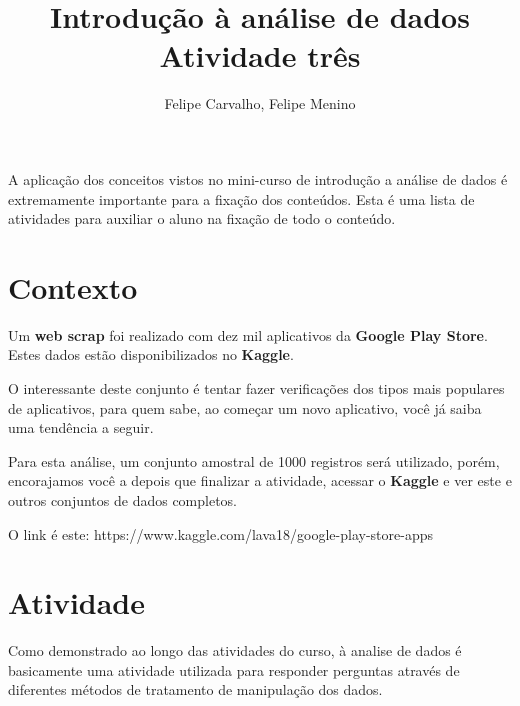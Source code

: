 \documentclass[12pt]{article}
\title{Introdução à análise de dados\\ Atividade três}
\author{Felipe Carvalho\inst{1}, Felipe Menino\inst{1}}
\begin{document}
 

\maketitle

     
\begin{resumo} 
    A aplicação dos conceitos vistos no mini-curso de introdução a análise de dados é extremamente importante para a fixação dos conteúdos. Esta é uma lista de atividades para auxiliar o aluno na fixação de todo o conteúdo.
\end{resumo}

\section{Contexto}

Um \textbf{web scrap} foi realizado com dez mil aplicativos da \textbf{Google Play Store}. Estes dados estão disponibilizados no \textbf{Kaggle}.

O interessante deste conjunto é tentar fazer verificações dos tipos mais populares de aplicativos, para quem sabe, ao começar um novo aplicativo, você já saiba uma tendência a seguir.

Para esta análise, um conjunto amostral de 1000 registros será utilizado, porém, encorajamos você a depois que finalizar a atividade, acessar o \textbf{Kaggle} e ver este e outros conjuntos de dados completos.

O link é este: https://www.kaggle.com/lava18/google-play-store-apps

\section{Atividade}

Como demonstrado ao longo das atividades do curso, à analise de dados é basicamente uma atividade utilizada para responder perguntas através de diferentes métodos de tratamento de manipulação dos dados.
\end{document}
